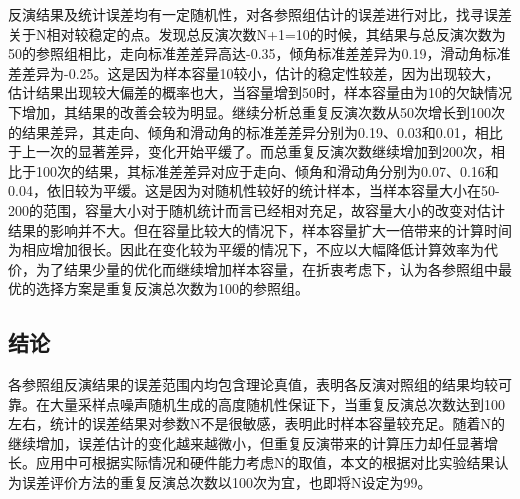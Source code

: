 反演结果及统计误差均有一定随机性，对各参照组估计的误差进行对比，找寻误差关于N相对较稳定的点。发现总反演次数N+1=10的时候，其结果与总反演次数为50的参照组相比，走向标准差差异高达-0.35，倾角标准差差异为0.19，滑动角标准差差异为-0.25。这是因为样本容量10较小，估计的稳定性较差，因为出现较大，估计结果出现较大偏差的概率也大，当容量增到50时，样本容量由为10的欠缺情况下增加，其结果的改善会较为明显。继续分析总重复反演次数从50次增长到100次的结果差异，其走向、倾角和滑动角的标准差差异分别为0.19、0.03和0.01，相比于上一次的显著差异，变化开始平缓了。而总重复反演次数继续增加到200次，相比于100次的结果，其标准差差异对应于走向、倾角和滑动角分别为0.07、0.16和0.04，依旧较为平缓。这是因为对随机性较好的统计样本，当样本容量大小在50-200的范围，容量大小对于随机统计而言已经相对充足，故容量大小的改变对估计结果的影响并不大。但在容量比较大的情况下，样本容量扩大一倍带来的计算时间为相应增加很长。因此在变化较为平缓的情况下，不应以大幅降低计算效率为代价，为了结果少量的优化而继续增加样本容量，在折衷考虑下，认为各参照组中最优的选择方案是重复反演总次数为100的参照组。

\subsection{结论}
各参照组反演结果的误差范围内均包含理论真值，表明各反演对照组的结果均较可靠。在大量采样点噪声随机生成的高度随机性保证下，当重复反演总次数达到100左右，统计的误差结果对参数N不是很敏感，表明此时样本容量较充足。随着N的继续增加，误差估计的变化越来越微小，但重复反演带来的计算压力却任显著增长。应用中可根据实际情况和硬件能力考虑N的取值，本文的根据对比实验结果认为误差评价方法的重复反演总次数以100次为宜，也即将N设定为99。
